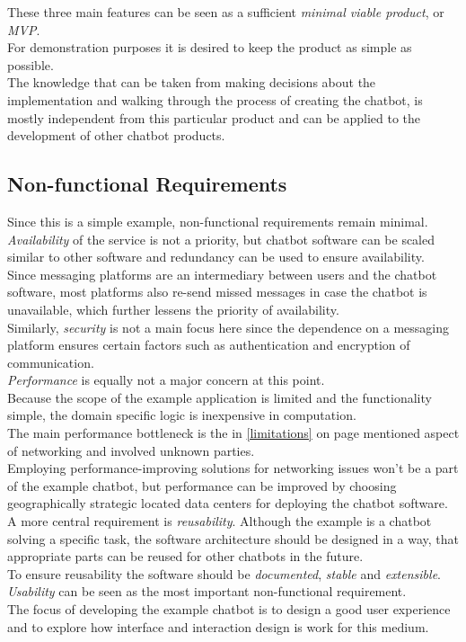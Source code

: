 These three main features can be seen as a sufficient \emph{minimal viable product}, or \emph{MVP}.
\\

For demonstration purposes it is desired to keep the product as simple as possible.
\\
The knowledge that can be taken from making decisions about the implementation and walking through the process of creating the chatbot,
is mostly independent from this particular product and can be applied to the development of other chatbot products.


\subsection{Non-functional Requirements}

Since this is a simple example, non-functional requirements remain minimal.
\\

\emph{Availability} of the service is not a priority, but chatbot software can be scaled similar to other software and redundancy can be used to ensure availability.
\\
Since messaging platforms are an intermediary between users and the chatbot software, most platforms also re-send missed messages in case the chatbot is unavailable, which further lessens the priority of availability.
\\

Similarly, \emph{security} is not a main focus here since the dependence on a messaging platform ensures certain factors such as authentication and encryption of communication.
\\

\emph{Performance} is equally not a major concern at this point.
\\
Because the scope of the example application is limited and the functionality simple,
the domain specific logic is inexpensive in computation.
\\
The main performance bottleneck is the in \ref{limitations} on page \pageref{limitations} mentioned aspect of networking and involved unknown parties.
\\
Employing performance-improving solutions for networking issues won't be a part of the example chatbot,
but performance can be improved by choosing geographically strategic located data centers for deploying the chatbot software.
\\

A more central requirement is \emph{reusability}.
Although the example is a chatbot solving a specific task,
the software architecture should be designed in a way,
that appropriate parts can be reused for other chatbots in the future.
\\
To ensure reusability the software should be \emph{documented}, \emph{stable} and \emph{extensible}.
\\

\emph{Usability} can be seen as the most important non-functional requirement.
\\
The focus of developing the example chatbot is to design a good user experience and to explore how interface and interaction design is work for this medium.
